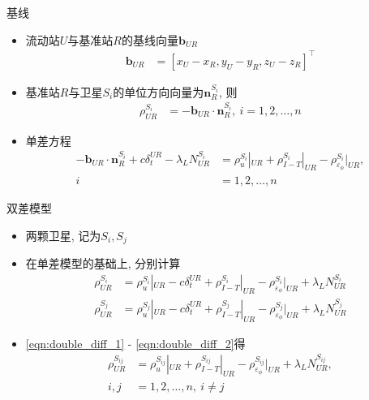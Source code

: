 \begin{frame}{基线}
    \begin{itemize}
        \item 流动站$U$与基准站$R$的基线向量$\mathbf b _ { UR }$
        \begin{align*}
            \mathbf b _ { UR } &= 
            \left[ x _ U - x _ R, y _ U - y _ R, z _ U - z _ R \right] ^ \top
        \end{align*}
        \item 基准站$R$与卫星$S _ i$的单位方向向量为$\mathbf n _ R ^ { S _ i }$, 则
        \begin{align*}
            \rho _ { UR } ^ { S _ i } &= - \mathbf b _ { UR } \cdot \mathbf n _ R ^ { S _ i },
            \ i = 1, 2, \ldots, n
        \end{align*}
        \item 单差方程
        \begin{align*}
            - \mathbf b _ { UR } \cdot \mathbf n _ R ^ { S _ i } + c \delta _ t ^ { UR }
            - \lambda _ L N _ { UR } ^ { S _ i }
            &=  \rho _ u ^ { S _ i } | _ { U R }
            + \rho _ { I - T } ^ { S _ i } | _ { UR } 
            - \rho _ { \varepsilon _ \phi } ^ { S _ i } | _ { UR }, \\ 
            i &= 1, 2, \ldots, n
        \end{align*}
    \end{itemize}
\end{frame}

\begin{frame}{双差模型}
    \begin{itemize}
        \item 两颗卫星, 记为$S _ i, S _ j$
        \item 在单差模型的基础上, 分别计算
        \begin{align}
            \rho _ { UR } ^ { S _ i } 
            &= \rho _ u ^ { S _ i } | _ { U R } - c \delta _ t ^ { UR }
            + \rho _ { I - T } ^ { S _ i } | _ { UR } 
            - \rho _ { \varepsilon _ \phi } ^ { S _ i } | _ { UR }
            + \lambda _ L N _ { UR } ^ { S _ i } \label{eqn:double_diff_1} \\
            \rho _ { UR } ^ { S _ j } 
            &= \rho _ u ^ { S _ j } | _ { U R } - c \delta _ t ^ { UR }
            + \rho _ { I - T } ^ { S _ j } | _ { UR } 
            - \rho _ { \varepsilon _ \phi } ^ { S _ j } | _ { UR }
            + \lambda _ L N _ { UR } ^ { S _ j } \label{eqn:double_diff_2}
        \end{align}
        \item \eqref{eqn:double_diff_1} - \eqref{eqn:double_diff_2}得
        \begin{align*}
            \rho _ { UR } ^ { S _ {ij} } 
            &= \rho _ u ^ { S _ {ij} } | _ { U R }
            + \rho _ { I - T } ^ { S _ {ij} } | _ { UR } 
            - \rho _ { \varepsilon _ \phi } ^ { S _ {ij} } | _ { UR }
            + \lambda _ L N _ { UR } ^ { S _ {ij} }, \\
            i, j &= 1, 2, \ldots, n, \ i \ne j
        \end{align*}
    \end{itemize}
\end{frame}

